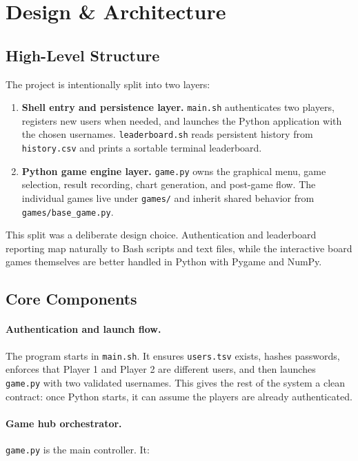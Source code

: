 \documentclass[12pt,a4paper]{article}
\begin{document}
\section{Design \& Architecture}

\subsection{High-Level Structure}

The project is intentionally split into two layers:

\begin{enumerate}[leftmargin=*]
    \item \textbf{Shell entry and persistence layer.} \texttt{main.sh} authenticates two players, registers new users when needed, and launches the Python application with the chosen usernames. \texttt{leaderboard.sh} reads persistent history from \texttt{history.csv} and prints a sortable terminal leaderboard.
    \item \textbf{Python game engine layer.} \texttt{game.py} owns the graphical menu, game selection, result recording, chart generation, and post-game flow. The individual games live under \texttt{games/} and inherit shared behavior from \texttt{games/base\_game.py}.
\end{enumerate}

This split was a deliberate design choice. Authentication and leaderboard reporting map naturally to Bash scripts and text files, while the interactive board games themselves are better handled in Python with Pygame and NumPy.

\subsection{Core Components}

\paragraph{Authentication and launch flow.}
The program starts in \texttt{main.sh}. It ensures \texttt{users.tsv} exists, hashes passwords, enforces that Player 1 and Player 2 are different users, and then launches \texttt{game.py} with two validated usernames. This gives the rest of the system a clean contract: once Python starts, it can assume the players are already authenticated.

\paragraph{Game hub orchestrator.}
\texttt{game.py} is the main controller. It:
\end{document}
